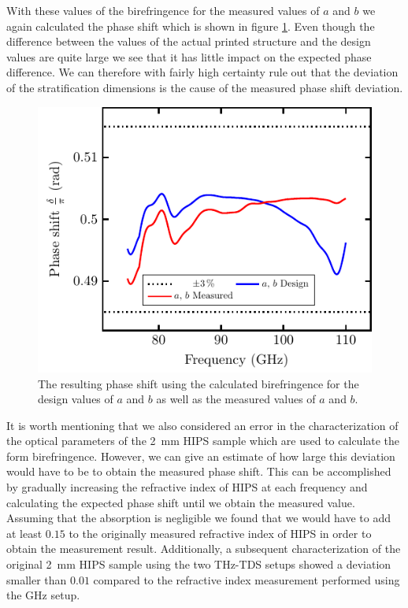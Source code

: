 With these values of the birefringence for the measured values of $a$ and $b$ we again calculated the phase shift which is shown in figure \ref{fig:delta_stripe_err}. Even though the difference between the values of the actual printed structure and the design values are quite large we see that it has little impact on the expected phase difference. We can therefore with fairly high certainty rule out that the deviation of the stratification dimensions is the cause of the measured phase shift deviation.

\begin{figure}[H]
    \centering
    \includegraphics[scale=.7]{images/results/plots/polymer/dimension_errors/delta_stripe_error.pdf}
    \caption{The resulting phase shift using the calculated birefringence for the design values of $a$ and $b$ as well as the measured values of $a$ and $b$.}
    \label{fig:delta_stripe_err}
\end{figure}

It is worth mentioning that we also considered an error in the characterization of the optical parameters of the \SI{2}{\milli \meter} HIPS sample which are used to calculate the form birefringence. However, we can give an estimate of how large this deviation would have to be to obtain the measured phase shift. This can be accomplished by gradually increasing the refractive index of HIPS at each frequency and calculating the expected phase shift until we obtain the measured value. Assuming that the absorption is negligible we found that we would have to add at least $0.15$ to the originally measured refractive index of HIPS in order to obtain the measurement result. Additionally, a subsequent characterization of the original \SI{2}{\milli \meter} HIPS sample using the two THz-TDS setups showed a deviation smaller than $0.01$ compared to the refractive index measurement performed using the GHz setup.

